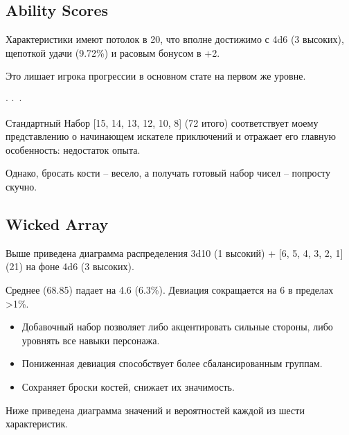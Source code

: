 \documentclass[a4paper,11pt]{book}
\newcommand{\threestars}{\begin{center}\vspace{-12pt}$ {\cdot}\,{\cdot}\,{\cdot} $\vspace{-7pt}\end{center}}
\begin{document}
\begin{multicols}{2}

\section{Ability Scores}

Характеристики имеют потолок в 20, что вполне достижимо с 4d6 (3 высоких), щепоткой удачи (9.72\%) и расовым бонусом в +2.

Это лишает игрока прогрессии в основном стате на первом же уровне.

\threestars

Стандартный Набор [15, 14, 13, 12, 10, 8] (72 итого) соответствует моему представлению о начинающем искателе приключений и отражает его главную особенность: недостаток опыта.

Однако, бросать кости -- весело, а получать готовый набор чисел -- попросту скучно.

\subsection{Wicked Array}

Выше приведена диаграмма распределения 3d10 (1 высокий) + [6, 5, 4, 3, 2, 1] (21) на фоне 4d6 (3 высоких).

Среднее (68.85) падает на 4.6 (6.3\%). Девиация сокращается на 6 в пределах >1\%.

\begin{itemize}
    \item Добавочный набор позволяет либо акцентировать сильные стороны, либо уровнять все навыки персонажа.
    \item Пониженная девиация способствует более сбалансированным группам.
    \item Сохраняет броски костей, снижает их значимость.
\end{itemize}

Ниже приведена диаграмма значений и вероятностей каждой из шести характеристик.

\end{multicols}

\wabilstable
\end{document}
